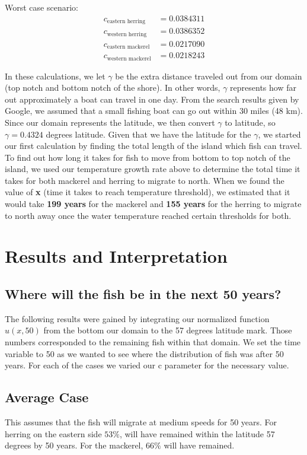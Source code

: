 \documentclass[12pt]{article}
\begin{document}
Worst case scenario:
\begin{align*}
    c_{\textrm{eastern herring}} &=  0.0384311\\
    c_{\textrm{western herring}} &=  0.0386352\\
    c_{\textrm{eastern mackerel}} &=  0.0217090\\
    c_{\textrm{western mackerel}} &= 0.0218243
\end{align*}

In these calculations, we let \textbf{\(\gamma\)} be the extra distance traveled out from our domain (top notch and bottom notch of the shore). In other words, \textbf{\(\gamma\)} represents how far out approximately a boat can travel in one day. From the search results given by Google, we assumed that a small fishing boat can go out within 30 miles (48 km). Since our domain represents the latitude, we then convert \textbf{\(\gamma\)} to latitude, so $\gamma=0.4324$ degrees latitude. Given that we have the latitude for the \textbf{\(\gamma\)}, we started our first calculation by finding the total length of the island which fish can travel. To find out how long it takes for fish to move from bottom to top notch of the island, we used our temperature growth rate above to determine the total time it takes for both mackerel and herring to migrate to north. When we found the value of \textbf{x} (time it takes to reach temperature threshold), we estimated that it would take \textbf{199 years} for the mackerel and \textbf{155 years} for the herring to migrate to north away once the water temperature reached certain thresholds for both.

\section{Results and Interpretation}
\subsection{Where will the fish be in the next 50 years?}

The following results were gained by integrating our normalized function $u(x,50)$ from the bottom our domain to the 57 degrees latitude mark. Those numbers corresponded to the remaining fish within that domain. We set the time variable to 50 as we wanted to see where the distribution of fish was after 50 years. For each of the cases we varied our c parameter for the necessary value.

\subsection{Average Case}
This assumes that the fish will migrate at medium speeds for 50 years. For herring on the eastern side $53\%$, will have remained within the latitude 57 degrees by 50 years. For the mackerel, $66\%$ will have remained.
\end{document}
